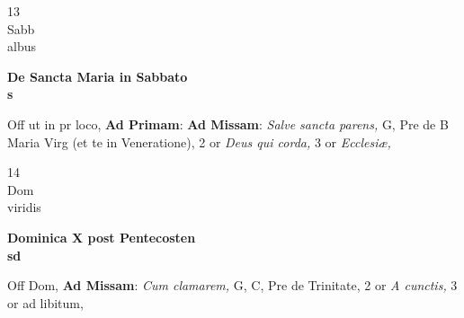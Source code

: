 \documentclass[10pt, openany]{book}
\begin{document}
        \begin{center}
            \begin{minipage}{3.5in}
                \vspace{2em}
                \begin{minipage}{0.5in}
                    {\Huge 13} \\
                    {\normalsize Sabb} \\
                    {\normalsize albus}
                \end{minipage}
                \begin{minipage}{3.0in}
                    \textbf{ \large De Sancta Maria in Sabbato \\
                    \textnormal{\normalsize s}} \\ 
                \end{minipage}
                \begin{justify}Off ut in pr loco, \textbf{Ad Primam}: \textbf{Ad Missam}: \textit{Salve sancta parens,} G, Pre de B Maria Virg (et te in Veneratione), 2 or \textit{Deus qui corda,} 3 or \textit{Ecclesiæ,}   
                \end{justify}
            \end{minipage}
        \end{center}
    
        \begin{center}
            \begin{minipage}{3.5in}
                \vspace{2em}
                \begin{minipage}{0.5in}
                    {\Huge 14} \\
                    {\normalsize Dom} \\
                    {\normalsize viridis}
                \end{minipage}
                \begin{minipage}{3.0in}
                    \textbf{ \large Dominica X post Pentecosten \\
                    \textnormal{\normalsize sd}} \\ 
                \end{minipage}
                \begin{justify}Off Dom, \textbf{Ad Missam}: \textit{Cum clamarem,} G, C, Pre de Trinitate, 2 or \textit{A cunctis,} 3 or ad libitum,   
                \end{justify}
            \end{minipage}
        \end{center}
    
\end{document}

